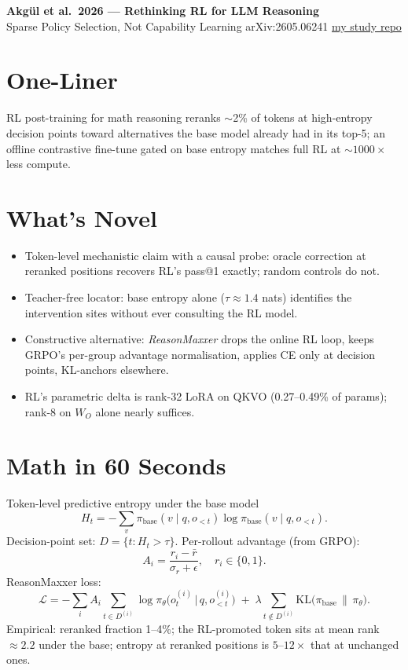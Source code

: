 \documentclass[10pt]{article}
\begin{document}
\begin{center}
  {\Large\textbf{Akg\"ul et al.\ 2026 --- Rethinking RL for LLM Reasoning}}\\[2pt]
  {\small Sparse Policy Selection, Not Capability Learning \quad\textbar\quad arXiv:2605.06241 \quad\textbar\quad \href{https://github.com/pleyva2004/rethinking-rl-llm-reasoning-sparse-policy-selection}{my study repo}}
\end{center}

\section*{One-Liner}
RL post-training for math reasoning reranks $\sim$2\% of tokens at high-entropy decision points toward alternatives the base model already had in its top-5; an offline contrastive fine-tune gated on base entropy matches full RL at $\sim 1000\times$ less compute.

\section*{What's Novel}
\begin{itemize}
  \item Token-level mechanistic claim with a causal probe: oracle correction at reranked positions recovers RL's pass@1 exactly; random controls do not.
  \item Teacher-free locator: base entropy alone ($\tau \approx 1.4$ nats) identifies the intervention sites without ever consulting the RL model.
  \item Constructive alternative: \emph{ReasonMaxxer} drops the online RL loop, keeps GRPO's per-group advantage normalisation, applies CE only at decision points, KL-anchors elsewhere.
  \item RL's parametric delta is rank-32 LoRA on QKVO (0.27--0.49\% of params); rank-8 on $W_O$ alone nearly suffices.
\end{itemize}

\section*{Math in 60 Seconds}
Token-level predictive entropy under the base model
\[
  H_t = -\sum_{v} \pi_{\text{base}}(v \mid q, o_{<t}) \log \pi_{\text{base}}(v \mid q, o_{<t}).
\]
Decision-point set: $D = \{t : H_t > \tau\}$. Per-rollout advantage (from GRPO):
\[
  A_i = \frac{r_i - \bar r}{\sigma_r + \epsilon}, \quad r_i \in \{0,1\}.
\]
ReasonMaxxer loss:
\[
  \mathcal{L} = -\sum_i A_i \!\!\sum_{t \in D^{(i)}}\!\! \log \pi_\theta\big(o_t^{(i)} \,\big|\, q, o_{<t}^{(i)}\big) \;+\; \lambda \!\!\sum_{t \notin D^{(i)}}\!\! \mathrm{KL}\big( \pi_{\text{base}} \,\big\|\, \pi_\theta \big).
\]
Empirical: reranked fraction 1--4\%; the RL-promoted token sits at mean rank $\approx 2.2$ under the base; entropy at reranked positions is $5$--$12\times$ that at unchanged ones.
\end{document}
